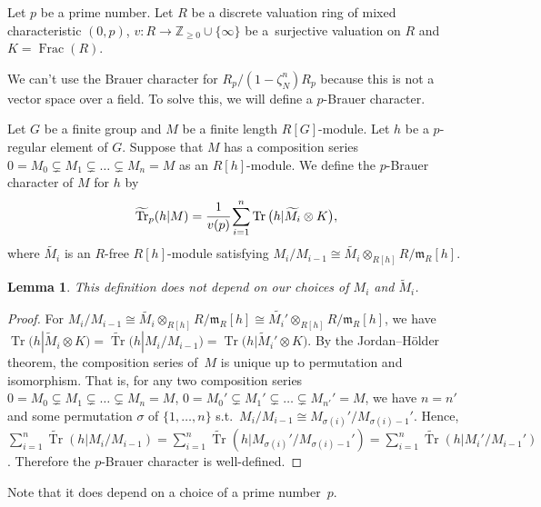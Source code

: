 \documentclass[11pt]{article}
\numberwithin{equation}{section}
\numberwithin{equation}{section}
\newtheorem{Lemma}[Theorem]{Lemma}
\begin{document}
Let $p$ be a prime number. Let $R$ be a discrete valuation ring of mixed characteristic $(0,p)$, $v\colon R\rightarrow \mathbb{Z}_{\geq 0}\cup \{ \infty \}$ be a~surjective valuation on $R$ and $K=\operatorname{Frac}(R)$.

We can't use the Brauer character for $R_p/(1-\zeta_N^n)R_p$ because this is not a vector space over a field. To solve this, we will define a $p$-Brauer character.

\begin{Definition}\label{def5.1}
Let $G$ be a finite group and $M$ be a finite length $R[G]$-module. Let $h$ be a $p$-regular element of $G$. Suppose that $M$ has a composition series $0=M_0\subsetneq M_1\subsetneq \dots \subsetneq M_n=M$ as an $R[h]$-module.
 We define the $p$-Brauer character of $M$ for $h$ by
\[
\widetilde{\operatorname{Tr}}_p(h|M)=\cfrac{1}{v(p)} \sum_{i=1}^{n}\operatorname{Tr} \big(h|\widetilde{M_i}\otimes K\big),
\]
 where $\widetilde{M_i}$ is an $R$-free $R[h]$-module satisfying $M_i/M_{i-1} \cong\widetilde{{M}_i}\otimes_{R[h]}R/\mathfrak{m}_R[h]$.
\end{Definition}

\begin{Lemma}
This definition does not depend on our choices of $M_i$ and $\widetilde{M}_i$.
\end{Lemma}

\begin{proof}
For $M_i/M_{i-1} \cong\widetilde{{M}_i}\otimes_{R[h]}R/\mathfrak{m}_R[h]\cong\widetilde{{M}_i'}\otimes_{R[h]}R/\mathfrak{m}_R[h]$, we have $\operatorname{Tr}\big(h|\widetilde{M}_i\otimes K\big)=\widetilde{\operatorname{Tr}}(h|M_i/M_{i-1})=\operatorname{Tr}\big(h|\widetilde{M}_i'\otimes K\big)$. By the Jordan--H\"older theorem, the composition series of~$M$ is unique up to permutation and isomorphism. That is, for any two composition series $0=M_0\subsetneq M_1\subsetneq \dots \subsetneq M_n=M$, $0=M_0'\subsetneq M_1'\subsetneq \dots \subsetneq M_{n'}'=M$, we have $n=n'$ and some permutation $\sigma$ of $\{1,\dots,n\}$ s.t.\ $M_i/M_{i-1}\cong M_{\sigma(i)}'/M_{\sigma(i)-1}'$. Hence, $\sum_{i=1}^{n}\widetilde{\operatorname{Tr}}(h|M_i/M_{i-1})=\sum_{i=1}^{n}\widetilde{\operatorname{Tr}}(h|M_{\sigma(i)}'/M_{\sigma(i)-1}') =\sum_{i=1}^n\widetilde{\operatorname{Tr}}(h|M_i'/M_{i-1}')$. Therefore the $p$-Brauer character is well-defined.
\end{proof}

Note that it does depend on a choice of a prime number~$p$.
\end{document}
